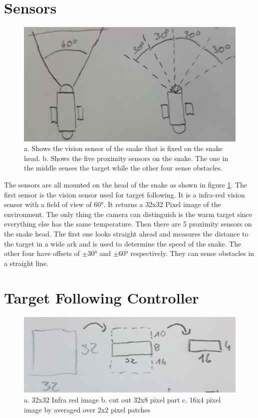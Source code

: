 \section{Sensors}

\begin{figure}
	\includegraphics[width=\linewidth]{images/sensors.jpg}
	\caption{a. Shows the vision sensor of the snake that is fixed on the snake head. b. Shows the five proximity sensors on the snake. The one in the middle senses the target while the other four sense obstacles.}
	\label{fig:sensors}
\end{figure}

The sensors are all mounted on the head of the snake as shown in figure \ref{fig:sensors}. The first sensor is the vision sensor used for target following. It is a infra-red vision sensor with a field of view of 60°. It returns a 32x32 Pixel image of the environment. The only thing the camera can distinguish is the warm target since everything else has the same temperature. Then there are 5 proximity sensors on the snake head. The first one looks straight ahead and measures the distance to the target in a wide ark and is used to determine the speed of the snake. The other four have offsets of $\pm30°$ and $\pm60°$ respectively. They can sense obstacles in a straight line.

\section{Target Following Controller}

\begin{figure}
	\includegraphics[width=\linewidth]{images/img_pre.jpg}
	\caption{a. 32x32 Infra red image b. cut out 32x8 pixel part c. 16x4 pixel image by averaged over 2x2 pixel patches}
	\label{fig:img_pre}
\end{figure}

